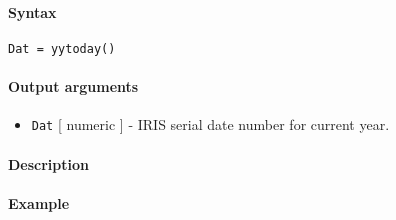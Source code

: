 


	\paragraph{Syntax}

\begin{verbatim}
Dat = yytoday()
\end{verbatim}

\paragraph{Output arguments}

\begin{itemize}
\itemsep1pt\parskip0pt
\item
  \texttt{Dat} {[} numeric {]} - IRIS serial date number for current
  year.
\end{itemize}

\paragraph{Description}

\paragraph{Example}


